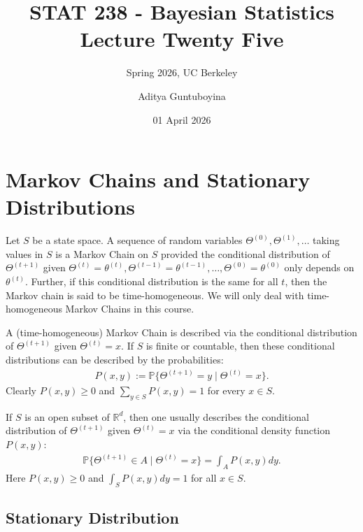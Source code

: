 \documentclass{scrartcl}
\newcommand{\R}{{\mathbb R}}
\renewcommand{\P}{{\mathbb P}}
\begin{document}
\title{STAT 238 - Bayesian Statistics  \\
  Lecture Twenty Five} 
\subtitle{Spring 2026, UC Berkeley}

\author{Aditya Guntuboyina}


\date{01 April 2026}

\maketitle

\section{Markov Chains and Stationary Distributions}

Let $S$ be a state space. A sequence of random variables $\Theta^{(0)},
\Theta^{(1)}, \dots$ taking values in $S$ is a 
Markov Chain on $S$ provided the conditional distribution of  
$\Theta^{(t+1)}$ given $\Theta^{(t)} = \theta^{(t)}, \Theta^{(t-1)} =
\theta^{(t-1)}, \dots, \Theta^{(0)} = \theta^{(0)}$ only depends on
$\theta^{(t)}$. Further, if this conditional distribution is the same
for all  $t$, then the Markov chain is said to be
time-homogeneous. We will only deal with time-homogeneous Markov
Chains in this course.

A (time-homogeneous) Markov Chain is described via the conditional
distribution of $\Theta^{(t+1)}$ given $\Theta^{(t)} = x$. If $S$ is
finite or countable, then these conditional distributions can be
described by the probabilities:
\begin{align*}
  P(x, y) := \P\{\Theta^{(t+1)} = y \mid \Theta^{(t)} = x\}. 
\end{align*}
Clearly $P(x, y) \geq 0$ and $\sum_{y \in S} P(x, y) = 1$ for every $x
\in S$.

If $S$ is an open subset of $\R^d$, then one usually describes the
conditional distribution of $\Theta^{(t+1)}$ given $\Theta^{(t)} = x$
via the conditional density function $P(x, y)$:
\begin{align*}
  \P\{\Theta^{(t+1)} \in A \mid \Theta^{(t)} = x\} = \int_A P(x, y)
  dy. 
\end{align*}
Here $P(x, y) \geq 0$ and $\int_S P(x, y) dy = 1$ for all $x \in S$.

\subsection{Stationary Distribution}
\end{document}
